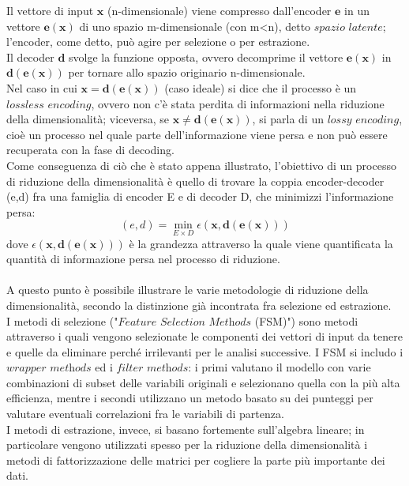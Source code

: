 Il vettore di input $\textbf{x}$ (n-dimensionale) viene compresso dall'encoder $\textbf{e}$ in un vettore $\textbf{e}(\textbf{x})$ di uno spazio m-dimensionale (con m<n), detto $\textit{spazio latente}$; l'encoder, come detto, può agire per selezione o per estrazione. \\
Il decoder $\textbf{d}$ svolge la funzione opposta, ovvero decomprime il vettore $\textbf{e}(\textbf{x})$ in $\textbf{d}(\textbf{e}(\textbf{x}))$ per tornare allo spazio originario n-dimensionale. \\
Nel caso in cui $\textbf{x} = \textbf{d}(\textbf{e}(\textbf{x}))$ (caso ideale) si dice che il processo è un $\textit{lossless encoding}$, ovvero non c'è stata perdita di informazioni nella riduzione della dimensionalità; viceversa, se $\textbf{x} \not= \textbf{d}(\textbf{e}(\textbf{x}))$, si parla di un $\textit{lossy encoding}$, cioè un processo nel quale parte dell'informazione viene persa e non può essere recuperata con la fase di decoding. \\
\newpage
Come conseguenza di ciò che è stato appena illustrato, l'obiettivo di un processo di riduzione della dimensionalità è quello di trovare la coppia encoder-decoder (e,d) fra una famiglia di encoder E e di decoder D, che minimizzi l'informazione persa:
\begin{equation}
(e,d) = \min_{E \times D} \epsilon (\textbf{x},\textbf{d}(\textbf{e}(\textbf{x})))
\end{equation}
dove $\epsilon (\textbf{x},\textbf{d}(\textbf{e}(\textbf{x})))$ è la grandezza attraverso la quale viene  quantificata la quantità di informazione persa nel processo di riduzione. \\ \\
A questo punto è possibile illustrare le varie metodologie di riduzione della dimensionalità, secondo la distinzione già incontrata fra selezione ed estrazione. \\
I metodi di selezione ("$\textit{Feature Selection Methods}$ (FSM)") sono metodi attraverso i quali vengono selezionate le componenti dei vettori di input da tenere e quelle da eliminare perché irrilevanti per le analisi successive. I FSM si includo i $\textit{wrapper methods}$ ed i $\textit{filter methods}$: i primi valutano il modello con varie combinazioni di subset delle variabili originali e selezionano quella con la più alta efficienza, mentre i secondi utilizzano un metodo basato su dei punteggi per valutare eventuali correlazioni fra le variabili di partenza. \\
I metodi di estrazione, invece, si basano fortemente sull'algebra lineare; in particolare vengono utilizzati spesso per la riduzione della dimensionalità i metodi di fattorizzazione delle matrici per cogliere la parte più importante dei dati. \\
